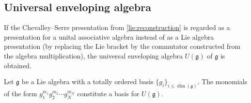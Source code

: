 \subsection{Universal enveloping algebra}\label{section:universal_enveloping_algebra}


    \begin{construct}\label{lie:enveloping_algebra_construct}
        If the Chevalley--Serre presentation from \cref{lie:reconstruction} is regarded as a presentation for a unital associative algebra instead of as a Lie algebra presentation (by replacing the Lie bracket by the commutator constructed from the algebra multiplication), the universal enveloping algebra $U(\mathfrak{g})$ of $\mathfrak{g}$ is obtained.
    \end{construct}

    \begin{theorem}
        Let $\mathfrak{g}$ be a Lie algebra with a totally ordered basis $\{g_i\}_{i\leq\dim(\mathfrak{g})}$. The monomials of the form $g_1^{m_1}g_2^{m_2}\cdots g_N^{m_N}$ constitute a basis for $U(\mathfrak{g})$.
    \end{theorem}

